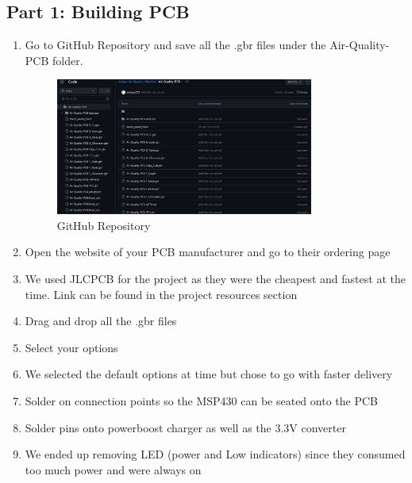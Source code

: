 \subsection{Part 1: Building PCB}
\begin{enumerate}

\item Go to GitHub Repository and save all the .gbr files under the Air-Quality-PCB folder. 

\begin{figure}[h]
    \centering
    \includegraphics[width=0.8\textwidth]{Pictures/image (7).png}
    \caption[GitHub Repository]{GitHub Repository} 
    \label{fig:part1commrin}
\end{figure}

\item Open the website of your PCB manufacturer and go to their ordering page
\item We used JLCPCB for the project as they were the cheapest and fastest at the time. Link can be found in the project resources section
\item Drag and drop all the .gbr files 
\item Select your options 
\item We selected the default options at time but chose to go with faster delivery 
\item Solder on connection points so the MSP430 can be seated onto the PCB
\item Solder pins onto powerboost charger as well as the 3.3V converter 
\item We ended up removing LED (power and Low indicators) since they consumed too much power and were always on
\end{enumerate}

